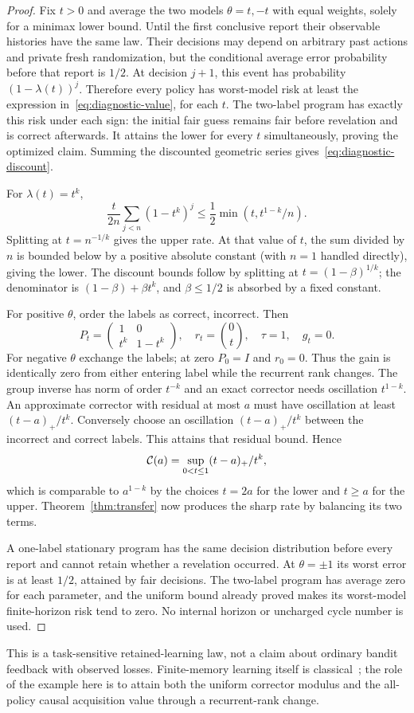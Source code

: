 \begin{proof}
Fix $t>0$ and average the two models $\theta=t,-t$ with equal weights, solely for a minimax lower bound. Until the first conclusive report their observable histories have the same law. Their decisions may depend on arbitrary past actions and private fresh randomization, but the conditional average error probability before that report is $1/2$. At decision $j+1$, this event has probability $(1-\lambda(t))^j$. Therefore every policy has worst-model risk at least the expression in~\eqref{eq:diagnostic-value}, for each $t$. The two-label program has exactly this risk under each sign: the initial fair guess remains fair before revelation and is correct afterwards. It attains the lower for every $t$ simultaneously, proving the optimized claim. Summing the discounted geometric series gives~\eqref{eq:diagnostic-discount}.

For $\lambda(t)=t^k$,
\[
 \frac{t}{2n}\sum_{j<n}(1-t^k)^j
 \le\frac12\min(t,t^{1-k}/n).
\]
Splitting at $t=n^{-1/k}$ gives the upper rate. At that value of $t$, the sum divided by $n$ is bounded below by a positive absolute constant (with $n=1$ handled directly), giving the lower. The discount bounds follow by splitting at $t=(1-\beta)^{1/k}$; the denominator is $(1-\beta)+\beta t^k$, and $\beta\le1/2$ is absorbed by a fixed constant.

For positive $\theta$, order the labels as correct, incorrect. Then
\[
 P_t=\begin{pmatrix}1&0\\t^k&1-t^k\end{pmatrix},\quad
 r_t=\binom{0}{t},\quad \tau=1,\quad g_t=0.
\]
For negative $\theta$ exchange the labels; at zero $P_0=I$ and $r_0=0$. Thus the gain is identically zero from either entering label while the recurrent rank changes. The group inverse has norm of order $t^{-k}$ and an exact corrector needs oscillation $t^{1-k}$. An approximate corrector with residual at most $a$ must have oscillation at least $(t-a)_+/t^k$. Conversely choose an oscillation $(t-a)_+/t^k$ between the incorrect and correct labels. This attains that residual bound. Hence
\[
 \mathcal C(a)=\sup_{0<t\le1}(t-a)_+/t^k,
\]
which is comparable to $a^{1-k}$ by the choices $t=2a$ for the lower and $t\ge a$ for the upper. Theorem~\ref{thm:transfer} now produces the sharp rate by balancing its two terms.

A one-label stationary program has the same decision distribution before every report and cannot retain whether a revelation occurred. At $\theta=\pm1$ its worst error is at least $1/2$, attained by fair decisions. The two-label program has average zero for each parameter, and the uniform bound already proved makes its worst-model finite-horizon risk tend to zero. No internal horizon or uncharged cycle number is used.
\end{proof}
This is a task-sensitive retained-learning law, not a claim about ordinary bandit feedback with observed losses. Finite-memory learning itself is classical~\cite{HellmanCover}; the role of the example here is to attain both the uniform corrector modulus and the all-policy causal acquisition value through a recurrent-rank change.

